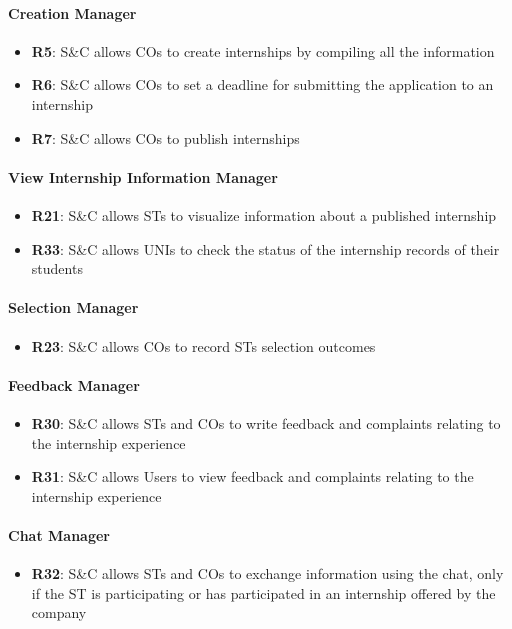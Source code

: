 \paragraph{Creation Manager}
\begin{itemize}
    \item \textbf{R5}: S\&C allows COs to create internships by compiling all the information
    \item \textbf{R6}: S\&C allows COs to set a deadline for submitting the application to an internship
    \item \textbf{R7}: S\&C  allows COs to publish internships
\end{itemize}

\paragraph{View Internship Information Manager}
\begin{itemize}
    \item \textbf{R21}: S\&C allows STs to visualize information about a published internship
    \item \textbf{R33}: S\&C allows UNIs to check the status of the internship records of their students
\end{itemize}

\paragraph{Selection Manager}
\begin{itemize}
    \item \textbf{R23}: S\&C allows COs to record STs selection outcomes
\end{itemize}

\paragraph{Feedback Manager}
\begin{itemize}
    \item \textbf{R30}: S\&C allows STs and COs to write feedback and complaints relating to the internship experience
    \item \textbf{R31}: S\&C allows Users to view feedback and complaints relating to the internship experience
\end{itemize}

\paragraph{Chat Manager}
\begin{itemize}
    \item \textbf{R32}: S\&C allows STs and COs to exchange information using the chat, only if the ST is participating or has participated 
                        in an internship offered by the company
\end{itemize}


